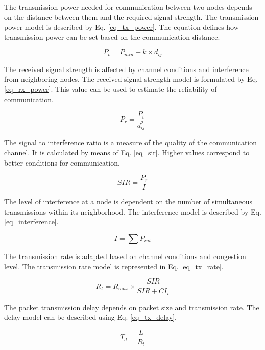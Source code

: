 \documentclass[a4paper,fleqn]{cas-dc}
\numberwithin{equation}{section}
\begin{document}
The transmission power needed for communication between two nodes depends on the distance between them and the required signal strength. The transmission power model is described by Eq. \ref{eq_tx_power}. The equation defines how transmission power can be set based on the communication distance.

\begin{equation}
P_t = P_{min} + k \times d_{ij}
\label{eq_tx_power}
\end{equation}

The received signal strength is affected by channel conditions and interference from neighboring nodes. The received signal strength model is formulated by Eq. \ref{eq_rx_power}. This value can be used to estimate the reliability of communication.

\begin{equation}
P_r = \frac{P_t}{d_{ij}^2}
\label{eq_rx_power}
\end{equation}

The signal to interference ratio is a measure of the quality of the communication channel. It is calculated by means of Eq. \ref{eq_sir}. Higher values correspond to better conditions for communication.

\begin{equation}
SIR = \frac{P_r}{I}
\label{eq_sir}
\end{equation}

The level of interference at a node is dependent on the number of simultaneous transmissions within its neighborhood. The interference model is described by Eq. \ref{eq_interference}.

\begin{equation}
I = \sum P_{int}
\label{eq_interference}
\end{equation}

The transmission rate is adapted based on channel conditions and congestion level. The transmission rate model is represented in Eq. \ref{eq_tx_rate}.

\begin{equation}
R_t = R_{max} \times \frac{SIR}{SIR + CI_i}
\label{eq_tx_rate}
\end{equation}

The packet transmission delay depends on packet size and transmission rate. The delay model can be described using Eq. \ref{eq_tx_delay}.

\begin{equation}
T_d = \frac{L}{R_t}
\label{eq_tx_delay}
\end{equation}
\end{document}
